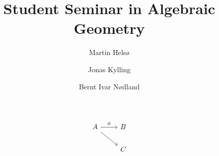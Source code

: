 \documentclass[a4paper, UKenglish]{report}
\title
{
    \bfseries\sffamily
    Student Seminar in Algebraic Geometry
}
\author
{
    Martin Hels\o
    \and
    Jonas Kylling
    \and 
    Bernt Ivar N\o dland
}
\begin{document}
\begin{titlepage}
    \maketitle
\end{titlepage}

\[
\begin{tikzcd}
  A \arrow[rd] \arrow [r, "\phi"] & B \\
  & C
\end{tikzcd}
\]

\clearpage
\printbibliography
\end{document}
